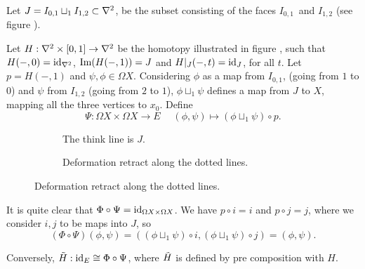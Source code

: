 \documentclass[a4paper,11pt,english]{article}
\begin{document}
\begin{exercise}[3]
Let $J = I_{0,1} \sqcup_1 I_{1,2} \subset \nabla^2$, be the subset consisting of
the faces $I_{0,1}$ and $I_{1,2}$ (see figure ).

Let $H: \nabla^2 \times [0,1] \to \nabla^2$ be the homotopy illustrated in figure
, such that $H(-,0) = \operatorname{id}_{\nabla^2}$, $\operatorname{Im}(H(-,1)) = J$ and
$H|_J(-,t) = \operatorname{id}_J$, for all $t$. Let $p = H(-,1)$ and $\psi, \phi \in \Omega
X$. Considering $\phi$ as a map from $I_{0,1}$, (going from $1$ to $0$) and
$\psi$ from $I_{1,2}$ (going from $2$ to $1$), $\phi \sqcup_1 \psi$ defines a
map from $J$ to $X$, mapping all the three vertices to $x_0$. Define 
\[ \Psi : \Omega X \times \Omega X \to E \; \quad (\phi, \psi) \mapsto
(\phi\sqcup_1 \psi) \circ p. \]

\begin{figure}[h]
\centering
\caption{}
\begin{subfigure}[b]{0.45\textwidth}
\centering

\caption{The think line is $J$.}
\label{fig:1a}
\end{subfigure}
\begin{subfigure}[b]{0.45\textwidth}
\centering

\caption{Deformation retract along the dotted lines.}
\label{fig:1b}
\end{subfigure}
\end{figure}

It is quite clear that $\Phi \circ \Psi = \operatorname{id}_{\Omega X \times \Omega X}$. We
have $p \circ i = i$ and $p \circ j = j$, where we consider $i,j$ to be maps
into $J$, so 
\[  (\Phi \circ \Psi)(\phi, \psi) = ( (\phi \sqcup_1 \psi) \circ i, (\phi
\sqcup_1 \psi) \circ j ) = (\phi, \psi). \]

Conversely, $\tilde H : \operatorname{id}_E \cong \Phi \circ \Psi$, where $\tilde H$ is defined
by pre composition with $H$.
\end{exercise}
\end{document}
